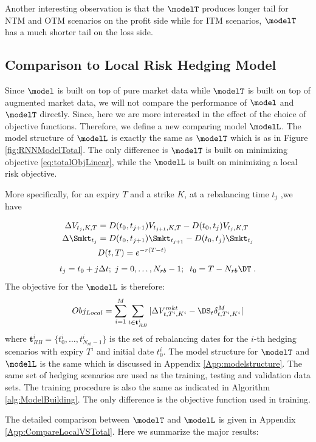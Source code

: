 Another interesting observation is that the $\modelT$ produces longer tail for NTM and OTM scenarios on the profit side while for ITM scenarios, $\modelT$  has a much shorter tail on the loss side.
\subsection{Comparison to Local Risk Hedging Model}
Since $\model$ is built on top of pure market data while $\modelT$ is built on top of augmented market data, we will not compare the performance of  $\model$ and $\modelT$ directly. Since, here we are more interested in the effect of the choice of objective functions. Therefore, we define a new comparing model $\modelL$. The model structure of $\modelL$ is exactly the same as  $\modelT$ which is as in Figure \ref{fig:RNNModelTotal}.  The only difference is $\modelT$ is built on minimizing objective \eqref{eq:totalObjLinear}, while the $\modelL$ is built on minimizing a local risk objective. 

More specifically, for an expiry $T$ and a strike $K$,  at a rebalancing time $t_j$ ,we have

\[
\begin{split}
\Delta V_{t_j,K,T}& =D(t_0,t_{j+1}) V_{t_{j+1},K,T}-D(t_0,t_{j})V_{t_j,K,T}\\
\Delta \Smkt_{t_j} &=D(t_0,t_{j+1}) \Smkt_{t_{j+1}}-D(t_0,t_{j}) \Smkt_{t_{j}}\\
&D(t,T)=e^{-r(T-t)}\\
\end{split}
\]
\[
t_j=t_0+j \Delta t;\; j=0,\dots,N_{rb}-1;\;\;t_0=T-N_{rb}\DT\;.
\]
The objective for the  $\modelL$  is therefore:
\begin{equation}
Obj_{Local}=\sum_{i=1}^M \sum_{t\in \mathbf{t}^i_{RB}} |\Delta V^{mkt}_{t,T^i,K^i}-\DS_{t} \delta^{M}_{t,T^i,K^i}|
\label{eq:LocalObjNew}
\end{equation}
where $\mathbf{t}^i_{RB}=\{t^i_0,\dots, t^i_{N_{rb}-1}\}$ is the set of rebalancing dates for the $i$-th hedging scenarios with expiry $T^i$ and initial date $t^i_0$. The model structure for $\modelT$ and  $\modelL$ is the same which is discussed in Appendix \ref{App:modelstructure}. The same set of hedging scenarios are used as the training, testing and validation data sets. The training procedure is also the same as indicated in Algorithm \ref{alg:ModelBuilding}. The only difference is the objective function used in training.


The detailed comparison between $\modelT$ and $\modelL$ is given in Appendix \ref{App:CompareLocalVSTotal}. Here we summarize the major results:

